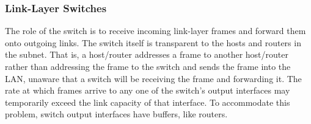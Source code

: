 \subsubsection{Link-Layer Switches}
The role of the switch is to receive incoming link-layer frames and forward them onto outgoing links. The switch itself is transparent to the hosts and routers in the subnet. That is, a host/router addresses a frame to another host/router rather than addressing the frame to the switch and sends the frame into the LAN, unaware that a switch will be receiving the frame and forwarding it. The rate at which frames arrive to any one of the switch's output interfaces may temporarily exceed the link capacity of that interface. To accommodate this problem, switch output interfaces have buffers, like routers.\vspace{.3cm}\\

